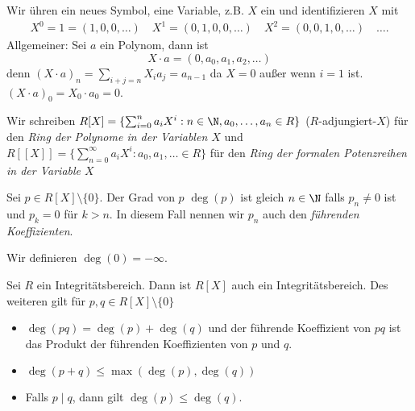 \begin{notation}
	Wir ühren ein neues Symbol, eine Variable, z.B. $X$ ein und identifizieren $X$ mit
	\begin{align*}
		X^{0} = 1 = (1,0,0,\ldots) \quad X^{1} = (0,1,0,0,\ldots) \quad X^2 = (0,0,1,0,\ldots) \quad \ldots
	.\end{align*}
	Allgemeiner: Sei $a$ ein Polynom, dann ist
	\[
		X \cdot a = (0,a_0,a_1,a_2,\ldots)
	\]
	denn $(X\cdot a)_{n} = \sum_{i+j=n} X_{i} a_{j} = a_{n-1}$ 
	da $X = 0$ außer wenn $i = 1$ ist. $(X\cdot a)_{0} = X_0\cdot a_0 = 0$.

	Wir schreiben $R[X] = \{\sum_{i=0}^{n} a_{i} X^{i} : n \in \N, a_0,\ldots,a_{n} \in R\}$ ($R$-adjungiert-$X$) für den \emph{Ring der Polynome in der Variablen $X$}
	und $R[\![ X ]\!] = \{\sum_{n=0}^{\infty} a_{i} X^{i} : a_0,a_1,\ldots \in R\} $ für den \emph{Ring der formalen Potenzreihen in der Variable $X$}
\end{notation}

\begin{definition}
	Sei $p \in R[X] \setminus \{0\}$. Der Grad von $p$ $\deg(p)$ ist gleich $n \in \N$ falls $p_{n} \neq 0$ ist und
	$p_{k} = 0$ für $k> n$. In diesem Fall nennen wir $p_{n}$ auch den \emph{führenden Koeffizienten}.
	
	Wir definieren $\deg(0) = - \infty$.
\end{definition}

\begin{proposition}
	Sei $R$ ein Integritätsbereich. Dann ist $R[X]$ auch ein Integritätsbereich.
	Des weiteren gilt für $p,q \in R[X] \setminus \{0\} $ 
	\begin{itemize}
		\item $\deg(pq) = \deg(p) + \deg(q)$ und der führende Koeffizient von $pq$ ist das Produkt der führenden Koeffizienten von $p$ und $q$.
		\item $\deg(p+q) \leq \max(\deg(p), \deg(q))$ 
		\item Falls $p \mid q$, dann gilt $\deg(p) \leq \deg(q)$.
	\end{itemize}
\end{proposition}

